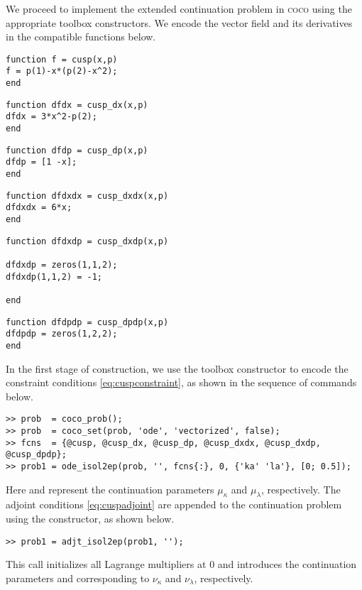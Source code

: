 We proceed to implement the extended continuation problem in \textsc{coco} using the appropriate  toolbox constructors. We encode the vector field and its derivatives in the  compatible functions below. 
\begin{lstlisting}[language=coco-highlight]
function f = cusp(x,p)
f = p(1)-x*(p(2)-x^2);
end
\end{lstlisting}
\begin{lstlisting}[language=coco-highlight]
function dfdx = cusp_dx(x,p)
dfdx = 3*x^2-p(2);
end
\end{lstlisting}
\begin{lstlisting}[language=coco-highlight]
function dfdp = cusp_dp(x,p)
dfdp = [1 -x];
end
\end{lstlisting}
\begin{lstlisting}[language=coco-highlight]
function dfdxdx = cusp_dxdx(x,p)
dfdxdx = 6*x;
end
\end{lstlisting}
\begin{lstlisting}[language=coco-highlight]
function dfdxdp = cusp_dxdp(x,p)

dfdxdp = zeros(1,1,2);
dfdxdp(1,1,2) = -1;

end
\end{lstlisting}
\begin{lstlisting}[language=coco-highlight]
function dfdpdp = cusp_dpdp(x,p)
dfdpdp = zeros(1,2,2);
end
\end{lstlisting}

In the first stage of construction, we use the  toolbox constructor to encode the constraint conditions \eqref{eq:cuspconstraint}, as shown in the sequence of commands below.
\begin{lstlisting}[language=coco-highlight]
>> prob  = coco_prob();
>> prob  = coco_set(prob, 'ode', 'vectorized', false);
>> fcns  = {@cusp, @cusp_dx, @cusp_dp, @cusp_dxdx, @cusp_dxdp, @cusp_dpdp};
>> prob1 = ode_isol2ep(prob, '', fcns{:}, 0, {'ka' 'la'}, [0; 0.5]);
\end{lstlisting}
Here  and  represent the continuation parameters $\mu_\kappa$ and $\mu_\lambda$, respectively. The adjoint conditions \eqref{eq:cuspadjoint} are appended to the continuation problem using the  constructor, as shown below.
\begin{lstlisting}[language=coco-highlight]
>> prob1 = adjt_isol2ep(prob1, '');
\end{lstlisting}
This call initializes all Lagrange multipliers at $0$ and introduces the continuation parameters  and  corresponding to $\nu_\kappa$ and $\nu_\lambda$, respectively.

